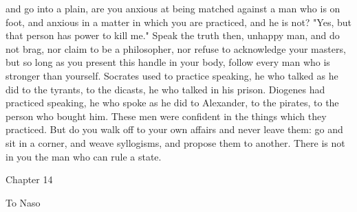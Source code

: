 \documentclass[a4paper]{article}
\begin{document}
and go into a plain, are you anxious at being matched against a man who is on
foot, and anxious in a matter in which you are practiced, and he is not? "Yes,
but that person has power to kill me." Speak the truth then, unhappy man, and
do not brag, nor claim to be a philosopher, nor refuse to acknowledge your
masters, but so long as you present this handle in your body, follow every man
who is stronger than yourself. Socrates used to practice speaking, he who
talked as he did to the tyrants, to the dicasts, he who talked in his prison.
Diogenes had practiced speaking, he who spoke as he did to Alexander, to the
pirates, to the person who bought him. These men were confident in the things
which they practiced. But do you walk off to your own affairs and never leave
them: go and sit in a corner, and weave syllogisms, and propose them to
another. There is not in you the man who can rule a state.

Chapter 14

To Naso
\end{document}
